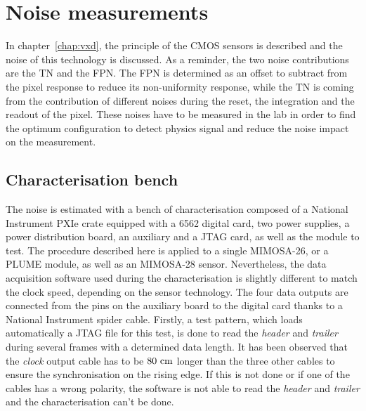 \section{Noise measurements}
\label{sec:noiseMeasurements}

  In chapter~\ref{chap:vxd}, the principle of the \gls{CMOS} sensors is described and the noise of this technology is discussed.
  As a reminder, the two noise contributions are the \acrfull{TN} and the \acrfull{FPN}.
  The \gls{FPN} is determined as an offset to subtract from the pixel response to reduce its non-uniformity response, while the \gls{TN} is coming from the contribution of different noises during the reset, the integration and the readout of the pixel.
  These noises have to be measured in the lab in order to find the optimum configuration to detect physics signal and reduce the noise impact on the measurement.

  \subsection{Characterisation bench}

  The noise is estimated with a bench of characterisation composed of a National Instrument PXIe crate equipped with a 6562 digital card, two power supplies, a power distribution board, an auxiliary and a \gls{JTAG} card, as well as the module to test.
  The procedure described here is applied to a single \gls{MIMOSA}-26, or a \gls{PLUME} module, as well as an \gls{MIMOSA}-28 sensor.
  Nevertheless, the data acquisition software used during the characterisation is slightly different to match the clock speed, depending on the sensor technology.
  The four data outputs are connected from the pins on the auxiliary board to the digital card thanks to a National Instrument spider cable.
  Firstly, a test pattern, which loads automatically a \gls{JTAG} file for this test, is done to read the \textit{header} and \textit{trailer} during several frames with a determined data length.
  It has been observed that the \textit{clock} output cable has to be $80~\rm{cm}$ longer than the three other cables to ensure the synchronisation on the rising edge.
  If this is not done or if one of the cables has a wrong polarity, the software is not able to read the \textit{header} and \textit{trailer} and the characterisation can't be done.

